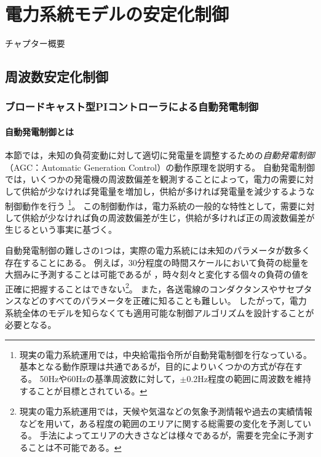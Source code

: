 \documentclass[tombow,dvipdfmx]{corona-a5}
\begin{document}
\chapter{電力系統モデルの安定化制御}

チャプター概要

\section{周波数安定化制御}
\subsection{ブロードキャスト型PIコントローラによる自動発電制御}

\subsubsection{自動発電制御とは}

本節では，未知の負荷変動に対して適切に発電量を調整するための\emph{自動発電制御}（AGC：Automatic Generation Control）の動作原理を説明する。
自動発電制御では，いくつかの発電機の周波数偏差を観測することによって，電力の需要に対して供給が少なければ発電量を増加し，供給が多ければ発電量を減少するような制御動作を行う
\footnote{
現実の電力系統運用では，中央給電指令所が自動発電制御を行なっている。
基本となる動作原理は共通であるが，目的によりいくつかの方式が存在する。
50Hzや60Hzの基準周波数に対して，$\pm$0.2Hz程度の範囲に周波数を維持することが目標とされている。
}。
この制御動作は，電力系統の一般的な特性として，需要に対して供給が少なければ負の周波数偏差が生じ，供給が多ければ正の周波数偏差が生じるという事実に基づく。

自動発電制御の難しさの1つは，実際の電力系統には未知のパラメータが数多く存在することにある。
例えば，30分程度の時間スケールにおいて負荷の総量を大掴みに予測することは可能であるが
，時々刻々と変化する個々の負荷の値を正確に把握することはできない\footnote{
現実の電力系統運用では，天候や気温などの気象予測情報や過去の実績情報などを用いて，ある程度の範囲のエリアに関する総需要の変化を予測している。
手法によってエリアの大きさなどは様々であるが，需要を完全に予測することは不可能である。
}。
また，各送電線のコンダクタンスやサセプタンスなどのすべてのパラメータを正確に知ることも難しい。
したがって，電力系統全体のモデルを知らなくても適用可能な制御アルゴリズムを設計することが必要となる。
\end{document}

